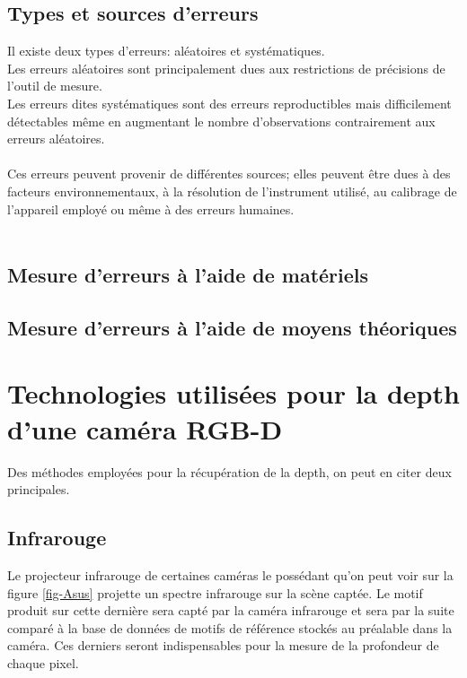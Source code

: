 \documentclass[a4paper, 12pt]{book}
\begin{document}
\subsection{Types et sources d'erreurs}
Il existe deux types d'erreurs: aléatoires et systématiques. \\ Les erreurs aléatoires sont principalement dues aux restrictions de précisions de l'outil de mesure. \\Les erreurs dites systématiques sont des erreurs reproductibles mais difficilement détectables même en augmentant le nombre d'observations contrairement aux erreurs aléatoires. \\ \\
Ces erreurs peuvent provenir de différentes sources; elles peuvent être dues à des facteurs environnementaux, à la résolution de l'instrument utilisé, au calibrage de l'appareil employé ou même à des erreurs humaines. \\ \\
\subsection{Mesure d'erreurs à l'aide de matériels}
\subsection{Mesure d'erreurs à l'aide de moyens théoriques}


\section[Technologies utilisées pour la depth]{Technologies utilisées pour la depth d'une caméra RGB-D} 
Des méthodes employées pour la récupération de la depth, on peut en citer deux principales.
\subsection{Infrarouge}
Le projecteur infrarouge de certaines caméras le possédant qu'on peut voir sur la figure \ref{fig-Asus} projette un spectre infrarouge sur la scène captée. Le motif produit sur cette dernière sera capté par la caméra infrarouge et sera par la suite comparé à la base de données de motifs de référence stockés au préalable dans la caméra. Ces derniers seront indispensables pour la mesure de la profondeur de chaque pixel. 
\end{document}
